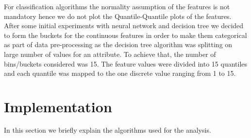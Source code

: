 \documentclass{article}
\begin{document}
\noindent For classification algorithms the normality assumption of the features is not mandatory hence we do not plot the Quantile-Quantile plots of the features. After some initial experiments with neural network and decision tree we decided to form the buckets for the continuous features in order to make them categorical as part of data pre-processing as the decision tree algorithm was splitting on large number of values for an attribute. To achieve that, the number of bins/buckets considered was 15. The feature values were divided into 15 quantiles and each quantile was mapped to the one discrete value ranging from 1 to 15.




\section{Implementation}
 
In this section we briefly explain the algorithms used for the analysis. 
\end{document}
